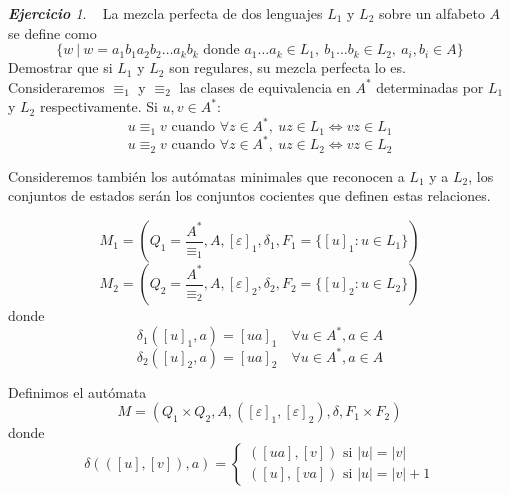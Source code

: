 \documentclass[12pt,spanish]{article}
\theoremstyle{definition}
\theoremstyle{remark}
\newtheorem{exercise}{\textbf{Ejercicio}}%
\begin{document}
\begin{exercise}~ La mezcla perfecta de dos lenguajes $L_1$ y $L_2$
  sobre un alfabeto $A$ se define como
  \[\{w \ | \ w=a_1b_1a_2b_2\ldots a_kb_k \text{ donde } a_1\ldots a_k
    \in L_1, \ b_1\ldots b_k \in L_2, \ a_i,b_i \in A\}\] Demostrar
  que si $L_1$ y $L_2$ son regulares, su mezcla perfecta lo es. \\

  Consideraremos $\equiv_1$ y $\equiv_2$ las clases de equivalencia en
  $A^*$ determinadas por $L_1$ y $L_2$ respectivamente. Si
  $u,v \in A^*$:
  \[u\equiv_1v \text{ cuando } \forall z \in A^*, \ uz \in L_1 \Leftrightarrow vz \in L_1\]
  \[u\equiv_2v \text{ cuando } \forall z \in A^*, \ uz \in L_2 \Leftrightarrow vz \in L_2\]

  Consideremos también los autómatas minimales que reconocen a $L_1$ y
  a $L_2$, los conjuntos de estados serán los conjuntos cocientes que
  definen estas relaciones.

  \[M_1=(Q_1=\frac{A^*}{\equiv_1},A,[\varepsilon]_1,\delta_1,F_1=\{[u]_1: u \in L_1\})\]  
  \[M_2=(Q_2=\frac{A^*}{\equiv_2},A,[\varepsilon]_2,\delta_2,F_2=\{[u]_2: u \in L_2\})\]
  donde
  \[\delta_1([u]_1,a)=[ua]_1 \quad \forall u \in A^*, a \in A\]
  \[\delta_2([u]_2,a)=[ua]_2 \quad \forall u \in A^*, a \in A\]

  Definimos el autómata
  \[M=(Q_1\times Q_2,A,([\varepsilon]_1,[\varepsilon]_2),\delta,F_1\times F_2)\]
  donde
  \[\delta(([u],[v]),a)=
  \begin{cases}
    ([ua],[v]) \text{ si } |u| = |v| \\
    ([u],[va]) \text{ si } |u| = |v|+1
  \end{cases}
  \]

\end{exercise}

~
\end{document}
